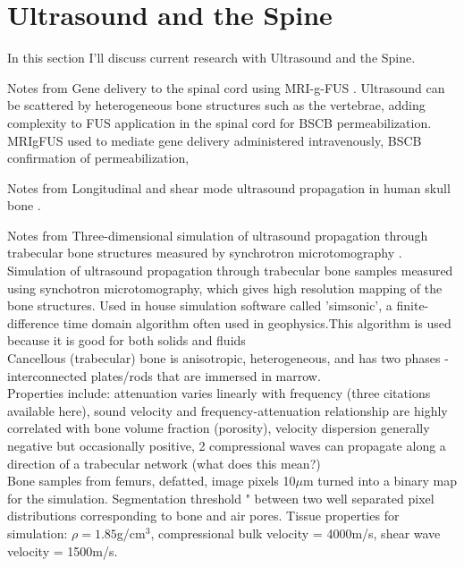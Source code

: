 \documentclass[11pt,titlepage]{article} %
\begin{document}
\section{Ultrasound and the Spine}

In this section I'll discuss current research with Ultrasound and the Spine.

Notes from Gene delivery to the spinal cord using MRI-g-FUS \cite{weber2015gene}.
Ultrasound can be scattered by heterogeneous bone structures such as the vertebrae, adding complexity to FUS application in the spinal cord for BSCB permeabilization.
MRIgFUS used to mediate gene delivery administered intravenously, BSCB confirmation of permeabilization, 

Notes from Longitudinal and shear mode ultrasound propagation in human skull bone \cite{white2006longitudinal}.


Notes from Three-dimensional simulation of ultrasound propagation through trabecular bone structures measured by synchrotron microtomography \cite{bossy2005three}.
Simulation of ultrasound propagation through trabecular bone samples measured using synchotron microtomography, which gives high resolution mapping of the bone structures.
Used in house simulation software called 'simsonic', a finite-difference time domain algorithm often used in geophysics.This algorithm is used because it is good for both solids and fluids \cite{graves1996simulating}\\
Cancellous (trabecular) bone is anisotropic, heterogeneous, and has two phases - interconnected plates/rods that are immersed in marrow. \\
Properties include: attenuation varies linearly with frequency (three citations available here), sound velocity and frequency-attenuation relationship are highly correlated with bone volume fraction (porosity), velocity dispersion generally negative but occasionally positive, 2 compressional waves can propagate along a direction of a trabecular network (what does this mean?)\\
Bone samples from femurs, defatted, image pixels 10$\mu$m turned into a binary map for the simulation. Segmentation threshold " between two well separated pixel distributions corresponding to bone and air pores. Tissue properties for simulation: $\rho = 1.85$g/cm$^3$, compressional bulk velocity = 4000m/s, shear wave velocity = 1500m/s.\\
\end{document}
